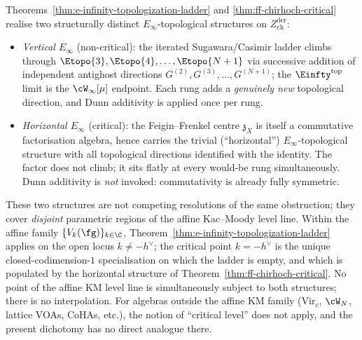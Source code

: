 \begin{remark}
\label{rem:horizontal-vs-vertical-einfty}
%
%
Theorems~\ref{thm:e-infinity-topologization-ladder} and
\ref{thm:ff-chirhoch-critical} realise two structurally distinct
$E_\infty$-topological structures on $Z^{\mathrm{der}}_{\mathrm{ch}}$:
\begin{itemize}
\item \emph{Vertical $E_\infty$} (non-critical): the iterated
Sugawara/Casimir ladder climbs through
$\Etopo{3}, \Etopo{4}, \ldots, \Etopo{N+1}$ via successive addition
of independent antighost directions
$G^{(2)}, G^{(3)}, \ldots, G^{(N+1)}$; the
$\Einfty^{\mathrm{top}}$ limit is the $\cW_\infty[\mu]$ endpoint.
Each rung adds a \emph{genuinely new} topological direction,
and Dunn additivity is applied once per rung.
\item \emph{Horizontal $E_\infty$} (critical): the
Feigin--Frenkel centre $\mathfrak{z}_X$ is itself a commutative
factorisation algebra, hence carries the trivial (``horizontal'')
$E_\infty$-topological structure with all topological directions
identified with the identity. The factor does not climb; it sits
flatly at every would-be rung simultaneously. Dunn additivity is
\emph{not} invoked: commutativity is already fully symmetric.
\end{itemize}
These two structures are not competing resolutions of the same
obstruction; they cover \emph{disjoint} parametric regions of the
affine Kac--Moody level line. Within the affine family
$\{V_k(\fg)\}_{k\in\C}$, Theorem~\ref{thm:e-infinity-topologization-ladder}
applies on the open locus $k \ne -h^\vee$; the critical point
$k = -h^\vee$ is the unique closed-codimension-$1$ specialisation on
which the ladder is empty, and which is populated by the horizontal
structure of Theorem~\ref{thm:ff-chirhoch-critical}. No point of the
affine KM level line is simultaneously subject to both structures;
there is no interpolation. For algebras outside the affine KM
family (Vir$_c$, $\cW_N$, lattice VOAs, CoHAs, etc.), the notion of
``critical level'' does not apply, and the present dichotomy has no
direct analogue there.
\end{remark}

